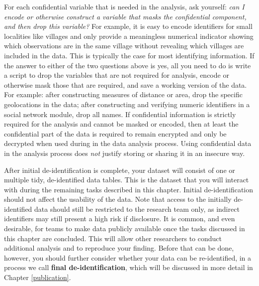 \documentclass[
]{book}
\begin{document}
For each confidential variable that is needed in the analysis, ask yourself:
\emph{can I encode or otherwise construct a variable that masks the confidential component, and
then drop this variable?}
For example, it is easy to encode identifiers for small localities like villages
and only provide a meaningless numerical indicator
showing which observations are in the same village
without revealing which villages are included in the data.
This is typically the case for most identifying information.
If the answer to either of the two questions above is yes,
all you need to do is write a script to drop the variables that are not required for analysis,
encode or otherwise mask those that are required,
and save a working version of the data.
For example:
after constructing measures of distance or area,
drop the specific geolocations in the data;
after constructing and verifying numeric identifiers in
a social network module, drop all names.
If confidential information is strictly required for the analysis and cannot be
masked or encoded,
then at least the confidential part of the data is required
to remain encrypted
and only be decrypted when used during in the data analysis process.
Using confidential data in the analysis process
does \emph{not} justify storing or sharing it in an insecure way.

After initial de-identification is complete,
your dataset will consist of one or multiple tidy,
de-identified data tables.
This is the dataset that you will interact with
during the remaining tasks described in this chapter.
Initial de-identification should not affect the usability of the data.
Note that access to the initially de-identified data
should still be restricted to the research team only,
as indirect identifiers may still present a high risk if disclosure.
It is common, and even desirable, for teams to make data publicly available
once the tasks discussed in this chapter are concluded.
This will allow other researchers to conduct additional analysis and to reproduce your finding.
Before that can be done, however,
you should further consider whether your data can be re-identified,
in a process we call \textbf{final de-identification},
which will be discussed in more detail in Chapter \ref{publication}.
\end{document}
